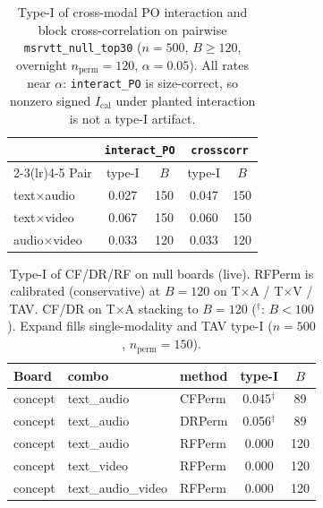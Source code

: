 \begin{table}[t]
\centering\small\setlength{\tabcolsep}{5pt}
\caption{Type-I of cross-modal PO interaction and block cross-correlation
  on pairwise \texttt{msrvtt\_null\_top30}
  ($n=500$, $B\ge 120$, overnight $n_{\mathrm{perm}}=120$, $\alpha=0.05$).
  All rates near $\alpha$: \texttt{interact\_PO} is size-correct,
  so nonzero signed $I_{\mathrm{cal}}$ under planted interaction is not a type-I artifact.}
\label{tab:delivery-po-typeI}
\begin{tabular}{l cc cc}
\toprule
& \multicolumn{2}{c}{\texttt{interact\_PO}} & \multicolumn{2}{c}{\texttt{crosscorr}} \\
\cmidrule(lr){2-3}\cmidrule(lr){4-5}
Pair & type-I & $B$ & type-I & $B$ \\
\midrule
text$\times$audio & 0.027 & 150 & 0.047 & 150 \\
text$\times$video & 0.067 & 150 & 0.060 & 150 \\
audio$\times$video & 0.033 & 120 & 0.033 & 120 \\
\bottomrule
\end{tabular}
\end{table}

\begin{table}[t]
\centering\small\setlength{\tabcolsep}{4pt}
\caption{Type-I of CF/DR/RF on null boards (live).
  RFPerm is calibrated (conservative) at $B=120$ on T$\times$A / T$\times$V / TAV.
  CF/DR on T$\times$A stacking to $B=120$ ($^\dagger$: $B<100$).
  Expand fills single-modality and TAV type-I
  ($n=500$, $n_{\mathrm{perm}}=150$).}
\label{tab:delivery-null-cfdr}
\begin{tabular}{l ll cc}
\toprule
Board & combo & method & type-I & $B$ \\
\midrule
concept & text\_audio & CFPerm & 0.045$^\dagger$ & 89 \\
concept & text\_audio & DRPerm & 0.056$^\dagger$ & 89 \\
concept & text\_audio & RFPerm & 0.000 & 120 \\
concept & text\_video & RFPerm & 0.000 & 120 \\
concept & text\_audio\_video & RFPerm & 0.000 & 120 \\
\bottomrule
\end{tabular}
\end{table}

